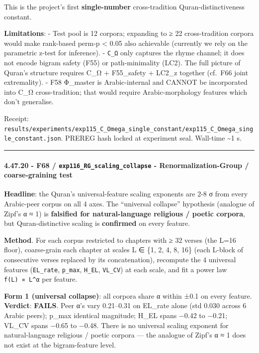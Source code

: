 \documentclass[
]{article}
\begin{document}
This is the project's first \textbf{single-number} cross-tradition
Quran-distinctiveness constant.

\textbf{Limitations}: - Test pool is 12 corpora; expanding to ≥ 22
cross-tradition corpora would make rank-based perm-p \textless{} 0.05
also achievable (currently we rely on the parametric z-test for
inference). - \texttt{C\_Ω} only captures the rhyme channel; it does not
encode bigram safety (F55) or path-minimality (LC2). The full picture of
Quran's structure requires C\_Ω + F55\_safety + LC2\_z together (cf.~F66
joint extremality). - F58 Φ\_master is Arabic-internal and CANNOT be
incorporated into C\_Ω cross-tradition; that would require
Arabic-morphology features which don't generalise.

Receipt:
\texttt{results/experiments/exp115\_C\_Omega\_single\_constant/exp115\_C\_Omega\_single\_constant.json}.
PREREG hash locked at experiment seal. Wall-time \textasciitilde1 s.

\begin{center}\rule{0.5\linewidth}{0.5pt}\end{center}

\paragraph{\texorpdfstring{4.47.20 - F68 /
\texttt{exp116\_RG\_scaling\_collapse} - Renormalization-Group /
coarse-graining
test}{4.47.20 - F68 / exp116\_RG\_scaling\_collapse - Renormalization-Group / coarse-graining test}}\label{f68-exp116_rg_scaling_collapse---renormalization-group-coarse-graining-test}

\textbf{Headline}: the Quran's universal-feature scaling exponents are
2-8 σ from every Arabic-peer corpus on all 4 axes. The ``universal
collapse'' hypothesis (analogue of Zipf's α ≈ 1) is \textbf{falsified
for natural-language religious / poetic corpora}, but Quran-distinctive
scaling is \textbf{confirmed} on every feature.

\textbf{Method}. For each corpus restricted to chapters with ≥ 32 verses
(the L=16 floor), coarse-grain each chapter at scales L ∈ \{1, 2, 4, 8,
16\} (each L-block of consecutive verses replaced by its concatenation),
recompute the 4 universal features (\texttt{EL\_rate}, \texttt{p\_max},
\texttt{H\_EL}, \texttt{VL\_CV}) at each scale, and fit a power law
\texttt{f(L)\ ∝\ L\^{}α} per feature.

\textbf{Form 1 (universal collapse)}: all corpora share α within ±0.1 on
every feature. \textbf{Verdict}: \textbf{FAILS}. Peer α's vary
0.21--0.31 on EL\_rate alone (std 0.030 across 6 Arabic peers); p\_max
identical magnitude; H\_EL spans −0.42 to −0.21; VL\_CV spans −0.65 to
−0.48. There is no universal scaling exponent for natural-language
religious / poetic corpora --- the analogue of Zipf's α ≈ 1 does not
exist at the bigram-feature level.
\end{document}
